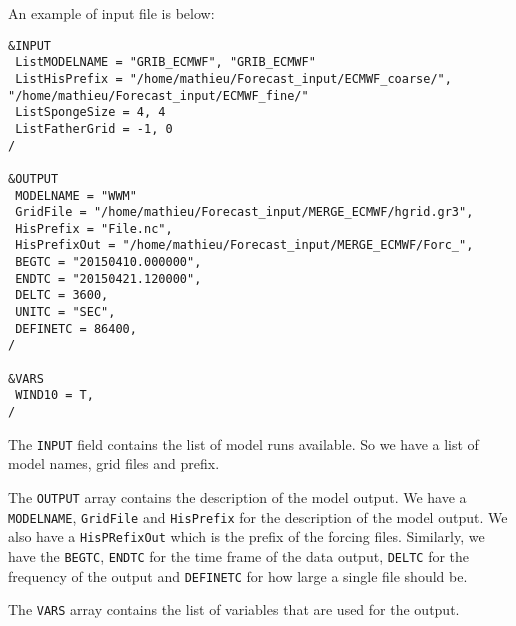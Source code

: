 \documentclass[12pt]{amsart}
\begin{document}
An example of input file is below:
\begin{verbatim}
&INPUT
 ListMODELNAME = "GRIB_ECMWF", "GRIB_ECMWF"
 ListHisPrefix = "/home/mathieu/Forecast_input/ECMWF_coarse/", "/home/mathieu/Forecast_input/ECMWF_fine/"
 ListSpongeSize = 4, 4
 ListFatherGrid = -1, 0
/

&OUTPUT
 MODELNAME = "WWM"
 GridFile = "/home/mathieu/Forecast_input/MERGE_ECMWF/hgrid.gr3",
 HisPrefix = "File.nc",
 HisPrefixOut = "/home/mathieu/Forecast_input/MERGE_ECMWF/Forc_",
 BEGTC = "20150410.000000",
 ENDTC = "20150421.120000",
 DELTC = 3600, 
 UNITC = "SEC", 
 DEFINETC = 86400,
/

&VARS
 WIND10 = T, 
/
\end{verbatim}
The {\tt INPUT} field contains the list of model runs available. So we have a list of model names, grid files and prefix.

The {\tt OUTPUT} array contains the description of the model output. We have a {\tt MODELNAME}, {\tt GridFile} and {\tt HisPrefix} for the description of the model output. We also have a {\tt HisPRefixOut} which is the prefix of the forcing files.
Similarly, we have the {\tt BEGTC}, {\tt ENDTC} for the time frame of the data output, {\tt DELTC} for the frequency of the output and {\tt DEFINETC} for how large a single file should be.

The {\tt VARS} array contains the list of variables that are used for the output.
\end{document}
